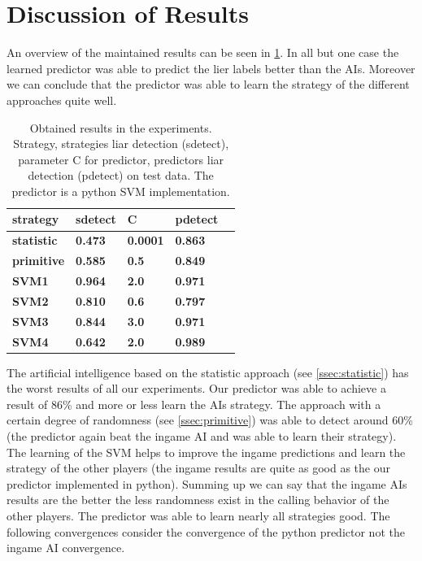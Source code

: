 \documentclass[11pt]{article}
\begin{document}
\section{Discussion of Results}
\label{secDiscussionOfResults}
An overview of the maintained results can be seen in \cref{tab:results}.
In all but one case the learned predictor was able to predict the lier labels better than the AIs. Moreover we can conclude that the predictor was able to learn the strategy of the different approaches quite well. 

\begin{table}[H]
\centering
\small
\begin{tabular}{|l|l|l|l|l|}
\hline
\textbf{strategy}&\textbf{sdetect}&\textbf{C}&\textbf{pdetect} \\ \hline
\textbf{statistic}&\textbf{0.473}&\textbf{0.0001}&\textbf{0.863} \\ \hline
\textbf{primitive}&\textbf{0.585}&\textbf{0.5}&\textbf{0.849} \\ \hline
\textbf{SVM1}&\textbf{0.964}&\textbf{2.0}&\textbf{0.971} \\ \hline
\textbf{SVM2}&\textbf{0.810}&\textbf{0.6}&\textbf{0.797}\\ \hline 
\textbf{SVM3}&\textbf{0.844}&\textbf{3.0}&\textbf{0.971}\\ \hline 
\textbf{SVM4}&\textbf{0.642}&\textbf{2.0}&\textbf{0.989} \\ \hline
\end{tabular}
\caption{Obtained results in the experiments. Strategy, strategies liar detection (sdetect), parameter C for predictor, predictors liar detection (pdetect) on test data. The predictor is a python SVM implementation.}
\label{tab:results}
\end{table}

The artificial intelligence based on the statistic approach (see \cref{ssec:statistic}) has the worst results of all our experiments. Our predictor was able to achieve a result of 86\% and more or less learn the AIs strategy.
The approach with a certain degree of randomness (see \cref{ssec:primitive}) was able to detect around 60\% (the predictor again beat the ingame AI and was able to learn their strategy).
The learning of the SVM helps to improve the ingame predictions and learn the strategy of the other players (the ingame results are quite as good as the our predictor implemented in python).
Summing up we can say that the ingame AIs results are the better the less randomness exist in the calling behavior of the other players.
The predictor was able to learn nearly all strategies good.
The following convergences consider the convergence of the python predictor not the ingame AI convergence.
\end{document}
